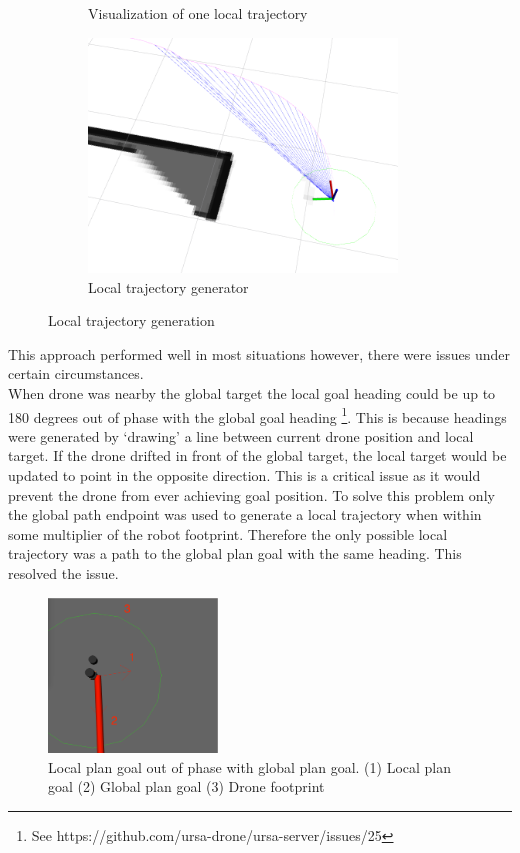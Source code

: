 \documentclass[capstone_report.tex]{subfiles}
\begin{document}
\begin{figure}[H]
\begin{subfigure}{0.33\textwidth}
        \caption{Visualization of one local trajectory}
    \end{subfigure}
    \begin{subfigure}{0.33\textwidth}
        \centering
        \includegraphics[width=0.9\textwidth]{imgs/local_traj_gen.png}
        \caption{Local trajectory generator}
    \end{subfigure}
    \caption{Local trajectory generation\label{fig:local_traj_gen}}
\end{figure}

This approach performed well in most situations however, there were issues under certain circumstances. \\

When drone was nearby the global target the local goal heading could be up to 180 degrees out of phase with the global goal heading \footnote{See https://github.com/ursa-drone/ursa-server/issues/25}.  This is because headings were generated by ‘drawing’ a line between current drone position and local target.  If the drone drifted in front of the global target, the local target would be updated to point in the opposite direction.  This is a critical issue as it would prevent the drone from ever achieving goal position.  To solve this problem only the global path endpoint was used to generate a local trajectory when within some multiplier of the robot footprint.  Therefore the only possible local trajectory was a path to the global plan goal with the same heading.  This resolved the issue.

\begin{figure}[H]
    \centering
    \includegraphics[width=0.4\textwidth]{imgs/out_of_phase_an.png}
    \caption{Local plan goal out of phase with global plan goal.  (1) Local plan goal (2) Global plan goal (3) Drone footprint\label{fig:lp_gp_out_of_phase}}
\end{figure}
\end{document}
